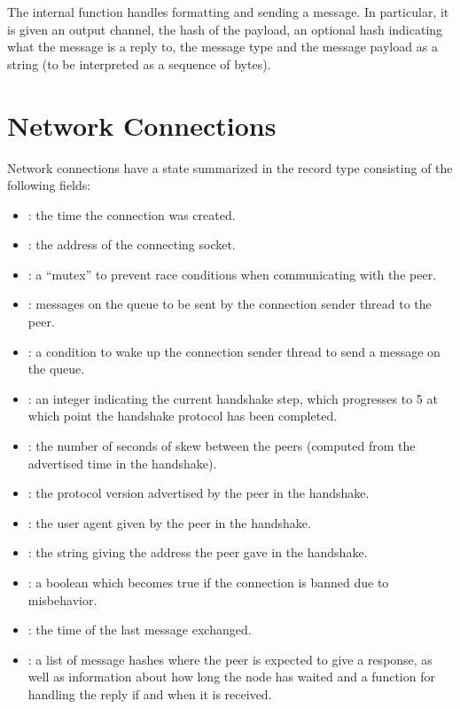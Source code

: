 The internal function {} handles formatting and sending a message.
In particular, it is given an output channel, the hash of the payload,
an optional hash indicating what the message is a reply to,
the message type
and the message payload as a string (to be interpreted as a sequence of bytes).

\section{Network Connections}

Network connections have a state summarized in the record type {} consisting of the following fields:
\begin{itemize}
\item {}: the time the connection was created.
\item {}: the address of the connecting socket.
\item {}: a ``mutex'' to prevent race conditions when communicating with the peer.
\item {}: messages on the queue to be sent by the connection sender thread to the peer.
\item {}: a condition to wake up the connection sender thread to send a message on the queue.
\item {}: an integer indicating the current handshake step, which progresses to 5 at which point the handshake protocol has been completed.
\item {}: the number of seconds of skew between the peers (computed from the advertised time in the handshake).
\item {}: the protocol version advertised by the peer in the handshake.
\item {}: the user agent given by the peer in the handshake.
\item {}: the string giving the address the peer gave in the handshake.
\item {}: a boolean which becomes true if the connection is banned due to misbehavior.
\item {}: the time of the last message exchanged.
\item {}: a list of message hashes where the peer is expected to give a response, as well as information about
how long the node has waited and a function for handling the reply if and when it is received.

\end{itemize}
